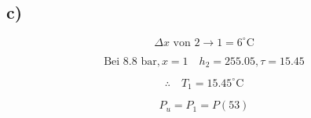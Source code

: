 

\subsection*{c)}

\[
\Delta x \text{ von } 2 \rightarrow 1 = 6^\circ \text{C}
\]

\[
\text{Bei } 8.8 \text{ bar}, x = 1 \quad h_2 = 255.05, \tau = 15.45
\]

\[
\therefore \quad T_1 = 15.45^\circ \text{C}
\]

\[
P_u = P_1 = P(53)
\]